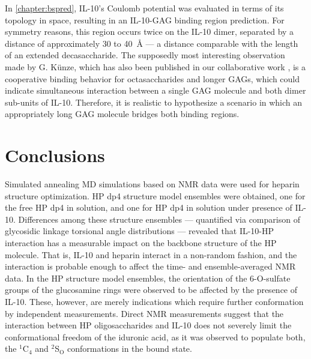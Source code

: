 In \cref{chapter:bspred}, IL-10's Coulomb potential was evaluated in terms of
its topology in space, resulting in an IL-10-GAG binding region prediction. For
symmetry reasons, this region occurs twice on the IL-10 dimer, separated by a
distance of approximately 30 to \SI{40}{\angstrom} --- a distance comparable
with the length of an extended decasaccharide. The supposedly most interesting
observation made by G. Künze, which has also been published in our collaborative
work \cite{kuenze_gehrcke_2014}, is a cooperative binding behavior for
octasaccharides and longer GAGs, which could indicate simultaneous interaction
between a single GAG molecule and both dimer sub-units of IL-10. Therefore, it
is realistic to hypothesize a scenario in which an appropriately long GAG
molecule bridges both binding regions.





\section{Conclusions}
Simulated annealing MD simulations based on NMR data were used for heparin
structure optimization. HP dp4 structure model ensembles were obtained, one for
the free HP dp4 in solution, and one for HP dp4 in solution under presence of
IL-10. Differences among these structure ensembles --- quantified via comparison
of glycosidic linkage torsional angle distributions --- revealed that IL-10-HP
interaction has a measurable impact on the backbone structure of the HP
molecule. That is, IL-10 and heparin interact in a non-random fashion, and the
interaction is probable enough to affect the time- and ensemble-averaged NMR
data. In the HP structure model ensembles, the orientation of the 6-O-sulfate
groups of the glucosamine rings were observed to be affected by the presence of
IL-10. These, however, are merely indications which require further conformation
by independent measurements. Direct NMR measurements suggest that the
interaction between HP oligosaccharides and IL-10 does not severely limit the
conformational freedom of the iduronic acid, as it was observed to populate
both, the ${}^1$C${}_4$ and ${}^2$S${}_\mathrm{O}$ conformations in the bound
state.

